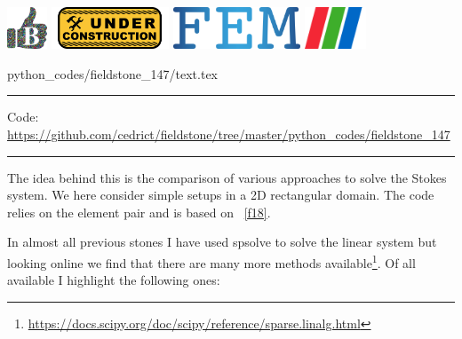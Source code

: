 \noindent
\includegraphics[height=1.25cm]{images/pictograms/benchmark}
\includegraphics[height=1.25cm]{images/pictograms/under_construction}
\includegraphics[height=1.25cm]{images/pictograms/FEM}
\includegraphics[height=1.25cm]{images/pictograms/paraview}



\begin{flushright} {\tiny {\color{gray} python\_codes/fieldstone\_147/text.tex}} \end{flushright}



\par\noindent\rule{\textwidth}{0.4pt}

\begin{center}
\inpython
{\small Code: \url{https://github.com/cedrict/fieldstone/tree/master/python_codes/fieldstone_147}}
\end{center}

\par\noindent\rule{\textwidth}{0.4pt}


The idea behind this \stone is the comparison of various approaches to solve the 
Stokes system. We here consider simple setups in a 2D rectangular domain. 
The code relies on the \QtwoQone element pair and is based on \stone~\ref{f18}.

In almost all previous stones I have used {\python spsolve} to solve the linear system
but looking online we find that there are many more methods 
available\footnote{\url{https://docs.scipy.org/doc/scipy/reference/sparse.linalg.html}}.
Of all available I highlight the following ones:

